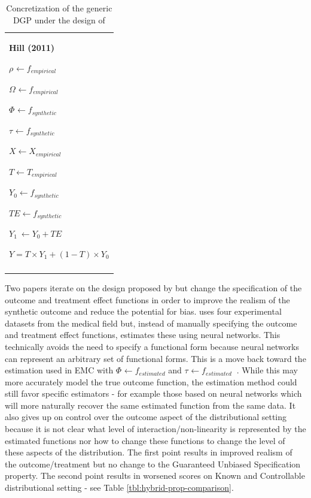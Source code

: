 \documentclass[../main.tex]{subfiles}
\begin{document}
\begin{table}[H]
 			\centering
\begin{tabular}{p{3.14in}}
\hline
\multicolumn{1}{|p{3.14in}|}{\textbf{Hill (2011)} \par  \(  \rho _{} \leftarrow f_{empirical}~ \)  \par  \(  \Omega _{} \leftarrow f_{empirical} \)  \par  \(  \Phi _{} \leftarrow f_{synthetic} \)  \par  \(  \tau_{} \leftarrow f_{synthetic}~ \)  \par  \( X \leftarrow X_{empirical} \)  \par  \( T \leftarrow T_{empirical} \)  \par  \( Y_{0} \leftarrow f_{synthetic} \)  \par  \( TE \leftarrow f_{synthetic} \)  \par  \( Y_{1}~ \leftarrow Y_{0}+ TE \)  \par  \( Y = T \times Y_{1}+  \left( 1-T \right)  \times Y_{0} \)  \par } \\
\hhline{-}

\end{tabular}
\caption{Concretization of the generic DGP under the design of \cite{Hill2011BayesianInference}}
\label{tbl:hill-hybrid}
\end{table}



\vspace{\baselineskip}
Two papers iterate on the design proposed by \cite{Hill2011BayesianInference} but change the specification of the outcome and treatment effect functions in order to improve the realism of the synthetic outcome and reduce the potential for bias. \cite{Wendling2018ComparingDatabases} uses four experimental datasets from the medical field but, instead of manually specifying the outcome and treatment effect functions, estimates these using neural networks. This technically avoids the need to specify a functional form because neural networks can represent an arbitrary set of functional forms. This is a move back toward the estimation used in EMC with  \(  \Phi _{} \leftarrow f_{estimated} \)  and  \(  \tau_{} \leftarrow f_{estimated}~ \) . While this may more accurately model the true outcome function, the estimation method could still favor specific estimators - for example those based on neural networks which will more naturally recover the same estimated function from the same data. It also gives up on control over the outcome aspect of the distributional setting because it is not clear what level of interaction/non-linearity is represented by the estimated functions nor how to change these functions to change the level of these aspects of the distribution. The first point results in improved realism of the outcome/treatment but no change to the Guaranteed Unbiased Specification property. The second point results in worsened scores on Known and Controllable distributional setting - see Table \ref{tbl:hybrid-prop-comparison}.\par
\end{document}

